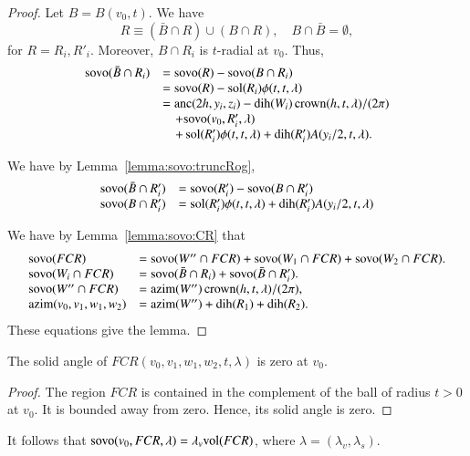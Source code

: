\begin{proof}
Let $B = B(v_0,t)$.  We have
$$R\equiv (\bar B\cap R) \cup (B\cap R),\quad B\cap \bar B = \emptyset,
$$
for $R=R_i,R'_i$.  Moreover, $B\cap R_i$ is $t$-radial at $v_0$.
Thus, 
 $$
\begin{array}{lll}
 {\operatorname{sovo}}(\bar B\cap R_i) &= {\operatorname{sovo}}(R) - {\operatorname{sovo}}(B\cap R_i)\\
 &= {\operatorname{sovo}}(R) - \operatorname{sol}(R_i)\phi(t,t,\lambda) \\
 &= {\operatorname{anc}}(2h,y_i,z_i) - \operatorname{dih}(W_i)\operatorname{crown}(h,t,\lambda)/(2\pi)\\
  &\quad +{\operatorname{sovo}}(v_0,R_i',\lambda)\\
  &\quad +\operatorname{sol}(R_i')\phi(t,t,\lambda)+\operatorname{dih}(R_i')A(y_i/2,t,\lambda).\\ 
\end{array}
 $$

We have by Lemma~\ref{lemma:sovo:truncRog}, 
$$
\begin{array}{lll}
{\operatorname{sovo}}(\bar B\cap R_i') &= {\operatorname{sovo}}(R'_i) - {\operatorname{sovo}}(B\cap R'_i)\\
{\operatorname{sovo}}(B\cap R'_i) &= \operatorname{sol}(R'_i)\phi(t,t,\lambda) + \operatorname{dih}(R'_i) A(y_i/2,t,\lambda)\\
\end{array}
$$

We have by Lemma~\ref{lemma:sovo:CR} that
$$
\begin{array}{lll}
{\operatorname{sovo}}(FCR) &= {\operatorname{sovo}}(W''\cap FCR) + {\operatorname{sovo}}(W_1\cap FCR)
 +{\operatorname{sovo}}(W_2\cap FCR).\\
{\operatorname{sovo}}(W_i\cap FCR) &= {\operatorname{sovo}}(\bar B\cap R_i) + {\operatorname{sovo}}(\bar B\cap R'_i).\\
 {\operatorname{sovo}}(W''\cap FCR) &= {\operatorname{azim}}(W'')\operatorname{crown}(h,t,\lambda)/(2\pi),\\
{\operatorname{azim}}(v_0,v_1,w_1,w_2)&= {\operatorname{azim}}(W'')+\operatorname{dih}(R_1)+\operatorname{dih}(R_2).\\
\end{array}
$$
These equations give the lemma.
\end{proof}

\begin{lemma}  The solid angle of $FCR(v_0,v_1,w_1,w_2,t,\lambda)$
is zero at $v_0$.
\end{lemma}

\begin{proof}  The region $FCR$ is contained in the complement
of the ball of radius $t>0$ at $v_0$.  It is bounded away from
zero.  Hence, its solid angle is zero.
\end{proof}

It follows that ${\operatorname{sovo}}(v_0,FCR,\lambda) = \lambda_v{\operatorname{vol}}(FCR)$,
where $\lambda=(\lambda_v,\lambda_s)$.



